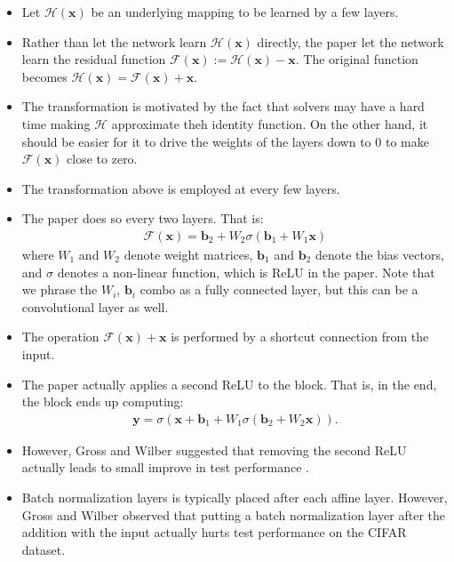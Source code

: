 \documentclass[10pt]{article}
\newcommand{\ve}[1]{\mathbf{#1}}
\begin{document}
  \begin{itemize}
  	\item Let $\mathcal{H}(\ve{x})$ be an underlying mapping to be learned by a few layers. 

  	\item Rather than let the network learn $\mathcal{H}(\ve{x})$ directly, the paper let the network learn the residual function $\mathcal{F}(\ve{x}) := \mathcal{H}(\ve{x}) - \ve{x}$. The original function becomes $\mathcal{H}(\ve{x}) = \mathcal{F}(\ve{x}) + \ve{x}$.

  	\item The transformation is motivated by the fact that solvers may have a hard time making $\mathcal{H}$ approximate theh identity function. On the other hand, it should be easier for it to drive the weights of the layers down to $0$ to make $\mathcal{F}(\ve{x})$ close to zero.

  	\item The transformation above is employed at every few layers.

  	\item The paper does so every two layers. That is:
  	\begin{align*}
  		\mathcal{F}(\ve{x}) = \ve{b}_2 + W_2 \sigma (\ve{b}_1 + W_1 \ve{x})
  	\end{align*}
  	where $W_1$ and $W_2$ denote weight matrices, $\ve{b}_1$ and $\ve{b}_2$ denote the bias vectors, and $\sigma$ denotes a non-linear function, which is ReLU in the paper. Note that we phrase the $W_i$, $\ve{b}_i$ combo as a fully connected layer, but this can be a convolutional layer as well.

  	\item The operation $\mathcal{F}(\ve{x}) + \ve{x}$ is performed by a shortcut connection from the input.

  	\item The paper actually applies a second ReLU to the block. That is, in the end, the block ends up computing:
  	\begin{align*}
  		\ve{y} = \sigma(\ve{x} + \ve{b}_1 + W_1 \sigma(\ve{b}_2 + W_2 \ve{x})).
  	\end{align*}

  	\item However, Gross and Wilber suggested that removing the second ReLU actually leads to small improve in test performance \cite{Gross:2016}.

  	\item Batch normalization layers is typically placed after each affine layer. However, Gross and Wilber observed that putting a batch normalization layer after the addition with the input actually hurts test performance on the CIFAR dataset.


\end{itemize}
\end{document}
